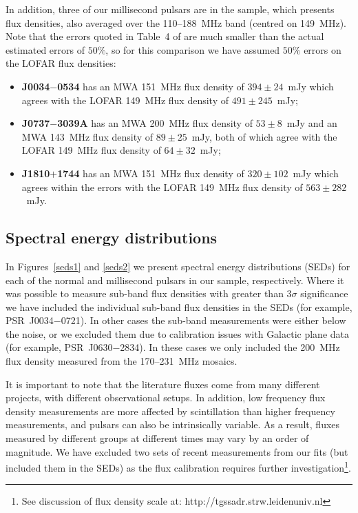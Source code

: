 \documentclass{pasa}%
\begin{document}
In addition, three of our millisecond pulsars are in the \citet{kondratiev16} sample, which presents flux densities, also averaged over the 110--188~MHz band (centred on 149~MHz). Note that the errors quoted in Table~4 of \citet{kondratiev16} are much smaller than the actual estimated errors of $50\%$, so for this comparison we have assumed $50\%$ errors on the LOFAR flux densities:
\begin{itemize}
\item {\bf J0034$-$0534} has an MWA 151~MHz flux density of $394\pm24$~mJy which agrees with the LOFAR 149~MHz flux density of $491\pm245$~mJy;
\item {\bf J0737$-$3039A} has an MWA 200~MHz flux density of $53\pm8$~mJy and an MWA 143~MHz flux density of $89\pm25$~mJy, both of which agree with the LOFAR 149~MHz flux density of $64\pm32$~mJy;
\item {\bf J1810$+$1744} has an MWA 151~MHz flux density of $320\pm102$~mJy which agrees within the errors with the LOFAR 149~MHz flux density of $563\pm282$~mJy.
\end{itemize}

\subsection{Spectral energy distributions}
In Figures~\ref{seds1} and \ref{seds2} we present spectral energy distributions (SEDs) for each of the normal and millisecond pulsars in our sample, respectively. Where it was possible to measure sub-band flux densities with greater than $3\sigma$ significance we have included the individual sub-band flux densities in the SEDs (for example, PSR~J0034$-$0721). In other cases the sub-band measurements were either below the noise, or we excluded them due to calibration issues with Galactic plane data (for example, PSR~J0630$-$2834). In these cases we only included the 200~MHz flux density measured from the 170--231~MHz mosaics.

It is important to note that the literature fluxes come from many different projects, with different observational setups. In addition, low frequency flux density measurements are more affected by scintillation than higher frequency measurements, and pulsars can also be intrinsically variable. As a result, fluxes measured by different groups at different times
may vary by an order of magnitude. We have excluded two sets of recent measurements \citep{stovall15,frail16} from our fits (but included them in the SEDs) as the flux calibration requires further investigation\footnote{See discussion of flux density scale at: http://tgssadr.strw.leidenuniv.nl}.
\end{document}
